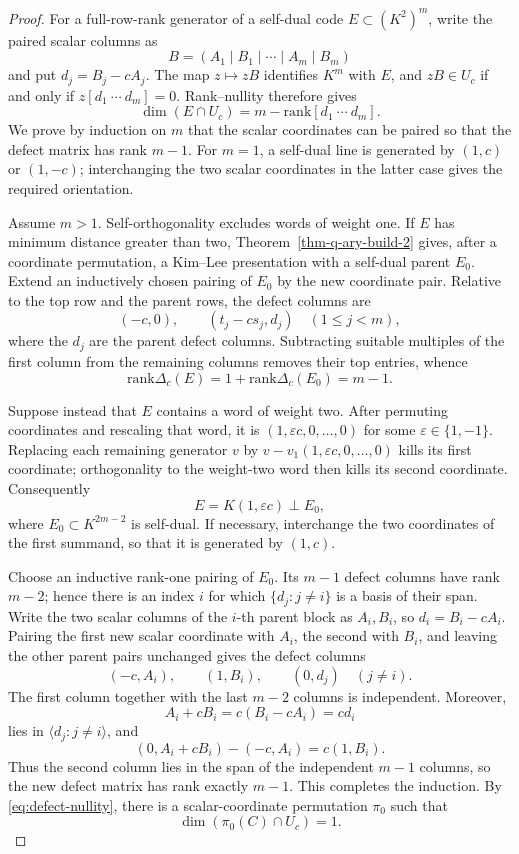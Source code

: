 \documentclass[12pt]{article}
\newcommand{\rank}{\mathrm{rank}}
\begin{document}
\begin{proof}
For a full-row-rank generator of a self-dual code
\(E\subset(K^2)^m\), write the paired scalar columns as
\[
B=(A_1\mid B_1\mid\cdots\mid A_m\mid B_m)
\]
and put \(d_j=B_j-cA_j\).  The map \(z\mapsto zB\) identifies \(K^m\)
with \(E\), and \(zB\in U_c\) if and only if
\(z[d_1\ \cdots\ d_m]=0\).  Rank--nullity therefore gives
\begin{equation}
\dim(E\cap U_c)=m-\rank[d_1\ \cdots\ d_m].
\label{eq:defect-nullity}
\end{equation}
We prove by induction on \(m\) that the scalar coordinates can be paired so
that the defect matrix has rank \(m-1\).  For \(m=1\), a self-dual line is
generated by \((1,c)\) or \((1,-c)\); interchanging the two scalar coordinates
in the latter case gives the required orientation.

Assume \(m>1\).  Self-orthogonality excludes words of weight one.  If \(E\)
has minimum distance greater than two,
Theorem~\ref{thm-q-ary-build-2} gives, after a coordinate permutation, a
Kim--Lee presentation with a self-dual parent \(E_0\).  Extend an inductively
chosen pairing of \(E_0\) by the new coordinate pair.  Relative to the top
row and the parent rows, the defect columns are
\[
(-c,0),\qquad (t_j-cs_j,d_j)\quad(1\le j<m),
\]
where the \(d_j\) are the parent defect columns.  Subtracting suitable
multiples of the first column from the remaining columns removes their top
entries, whence
\[
\rank\Delta_c(E)=1+\rank\Delta_c(E_0)=m-1.
\]

Suppose instead that \(E\) contains a word of weight two.  After permuting
coordinates and rescaling that word, it is \((1,\varepsilon c,0,\ldots,0)\)
for some \(\varepsilon\in\{1,-1\}\).  Replacing each remaining generator
\(v\) by \(v-v_1(1,\varepsilon c,0,\ldots,0)\) kills its first coordinate;
orthogonality to the weight-two word then kills its second coordinate.
Consequently
\[
E=K(1,\varepsilon c)\perp E_0,
\]
where \(E_0\subset K^{2m-2}\) is self-dual.  If necessary, interchange the
two coordinates of the first summand, so that it is generated by \((1,c)\).

Choose an inductive rank-one pairing of \(E_0\).  Its \(m-1\) defect
columns have rank \(m-2\); hence there is an index \(i\) for which
\(\{d_j:j\ne i\}\) is a basis of their span.  Write the two scalar columns
of the \(i\)-th parent block as \(A_i,B_i\), so
\(d_i=B_i-cA_i\).  Pairing the first new scalar coordinate with \(A_i\),
the second with \(B_i\), and leaving the other parent pairs unchanged gives
the defect columns
\[
(-c,A_i),\qquad(1,B_i),\qquad(0,d_j)\quad(j\ne i).
\]
The first column together with the last \(m-2\) columns is independent.
Moreover,
\[
A_i+cB_i=c(B_i-cA_i)=cd_i
\]
lies in \(\langle d_j:j\ne i\rangle\), and
\[
(0,A_i+cB_i)-(-c,A_i)=c(1,B_i).
\]
Thus the second column lies in the span of the independent \(m-1\) columns,
so the new defect matrix has rank exactly \(m-1\).  This completes the
induction.  By \eqref{eq:defect-nullity}, there is a scalar-coordinate
permutation \(\pi_0\) such that
\[
\dim(\pi_0(C)\cap U_c)=1.
\]


\end{proof}
\end{document}
